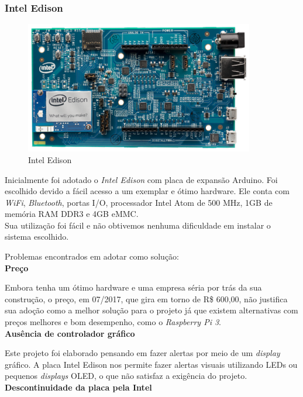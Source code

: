 \documentclass[
	12pt,				%
	oneside,			%
	a4paper,			%
	brazil				%
]{abntex2}
\begin{document}
\subsubsection{Intel Edison}

\begin{figure}[H]
\centering
\includegraphics[width=10cm, center]{images/intel-edison-arduino-kit}
\caption{Intel Edison}
\label{Rotulo}
\end{figure}

Inicialmente foi adotado o \textit{Intel Edison} com placa de expansão Arduino. Foi escolhido devido a fácil acesso a um exemplar e ótimo hardware. Ele conta com \textit{WiFi}, \textit{Bluetooth}, portas I/O, processador Intel Atom de 500 MHz, 1GB de memória RAM DDR3 e 4GB eMMC. \\

Sua utilização foi fácil e não obtivemos nenhuma dificuldade em instalar o sistema escolhido.


Problemas encontrados em adotar como solução:
\\

\textbf{Preço}

Embora tenha um ótimo hardware e uma empresa séria por trás da sua construção, o preço, em 07/2017, que gira em torno de R\$ 600,00, não justifica sua adoção como a melhor solução para o projeto já que existem alternativas com preços melhores e bom desempenho, como o \textit{Raspberry Pi 3}.
\\

\textbf{Ausência de controlador gráfico}

Este projeto foi elaborado pensando em fazer alertas por meio de um \textit{display} gráfico. A placa Intel Edison nos permite fazer alertas visuais utilizando LEDs ou pequenos \textit{displays} OLED, o que não satisfaz a exigência do projeto.  
\\

\textbf{Descontinuidade da placa pela Intel}
\end{document}

